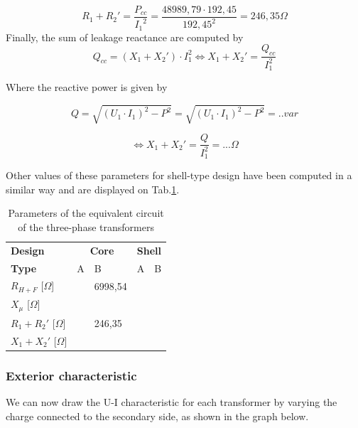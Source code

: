 \documentclass[12pt,a4paper]{report}
\begin{document}
\begin{equation}
    R_1 + R_2' = \frac{P_{cc}}{{I_1}^2} = \frac{48989,79 \cdot 192,45}{192,45^2} = 246,35 \Omega
\end{equation}
Finally, the sum of leakage reactance are computed by
\begin{equation}
Q_{cc} = (X_1 + X_2') \cdot I_1^2 \iff X_1 + X_2' = \frac{Q_{cc}}{I_1^2}
\end{equation}

Where the reactive power is given by

\begin{equation}
    Q = \sqrt{(U_1 \cdot I_1)^2-P^2} = \sqrt{(U_1 \cdot I_1)^2-P^2} = .. var
\end{equation}

\begin{equation}
    \iff X_1 + X_2' = \frac{Q}{I_1^2} = ... \Omega
\end{equation}

Other values of these parameters for shell-type design have been computed in a similar way and are displayed on Tab.\ref{tab:equivalent_parameters}.

\begin{table}[h]
    \centering
\begin{tabular}{l|ll|ll}
\textbf{Design}                            & \multicolumn{2}{c|}{\textbf{Core}} & \multicolumn{2}{c}{\textbf{Shell}} \\
\textbf{Type}      &     A & B & A & B\\
$R_{H+F}$ [$\Omega$] & & 6998,54 & & \\
$X_\mu$ [$\Omega$] & & & & \\
$R_1 + R_2'$ [$\Omega$] & & 246,35 & & \\
$X_1 + X_2'$ [$\Omega$] & & & & \\
           

\end{tabular}
    \caption{Parameters of the equivalent circuit of the three-phase transformers}
    \label{tab:equivalent_parameters}
\end{table}

\subsubsection{Exterior characteristic}
We can now draw the U-I characteristic for each transformer by varying the charge connected to the secondary side, as shown in the graph below.
\end{document}
